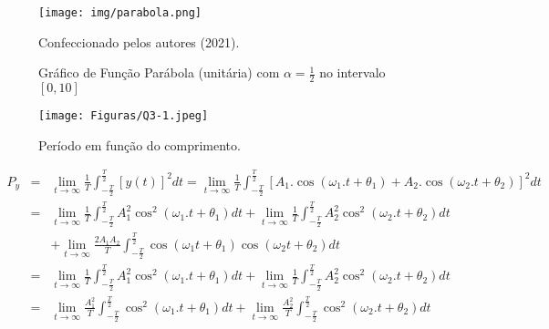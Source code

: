 
\begin{figure}[!h]
    \centering
    \texttt{[image: img/parabola.png]}
    \caption{Gráfico de Função Parábola (unitária) com $\alpha = \frac{1}{2}$ no intervalo $[0,10]$}
    \label{fig:rampa}
    \begin{flushright}
        Confeccionado pelos autores (2021).
    \end{flushright}
\end{figure} 


\begin{figure}[H]
    \centering
    \caption{Período em função do comprimento.}
    \texttt{[image: Figuras/Q3-1.jpeg]}
    \label{fig:Q03-1}
\end{figure}


\begin{eqnarray*} \label{eq:py}
    P_y &=& \lim_{t\to\infty} \frac{1}{T} \int_{-\frac{T}{2}}^{\frac{T}{2}} [y(t)]^2 dt = \lim_{t\to\infty} \frac{1}{T} \int_{-\frac{T}{2}}^{\frac{T}{2}} [A_1.\cos{(\omega_1.t + \theta_1)}+A_2.\cos{(\omega_2.t + \theta_2)}]^2 dt \\
     &=& \lim_{t\to\infty} \frac{1}{T} \int_{-\frac{T}{2}}^{\frac{T}{2}} A_1^2 \cos^2(\omega_1.t+\theta_1) dt + \lim_{t\to\infty} \frac{1}{T} \int_{-\frac{T}{2}}^{\frac{T}{2}} A_2^2 \cos^2(\omega_2.t+\theta_2) dt \\
    && + \lim_{t\to\infty} \frac{2A_1A_2}{T} \int_{-\frac{T}{2}}^{\frac{T}{2}}  \cos(\omega_1t+\theta_1) \cos(\omega_2t + \theta_2) dt \\
     &=& \lim_{t\to\infty} \frac{1}{T} \int_{-\frac{T}{2}}^{\frac{T}{2}} A_1^2 \cos^2(\omega_1.t+\theta_1) dt + \lim_{t\to\infty} \frac{1}{T} \int_{-\frac{T}{2}}^{\frac{T}{2}} A_2^2 \cos^2(\omega_2.t+\theta_2) dt \\
    &=& \lim_{t\to\infty} \frac{A_1^2}{T} \int_{-\frac{T}{2}}^{\frac{T}{2}} \cos^2(\omega_1.t+\theta_1) dt + \lim_{t\to\infty} \frac{A_2^2}{T} \int_{-\frac{T}{2}}^{\frac{T}{2}} \cos^2(\omega_2.t+\theta_2) dt 
\end{eqnarray*}

\begin{lstlisting}[language=Octave]


\end{lstlisting}


\usepackage{listings}           %

